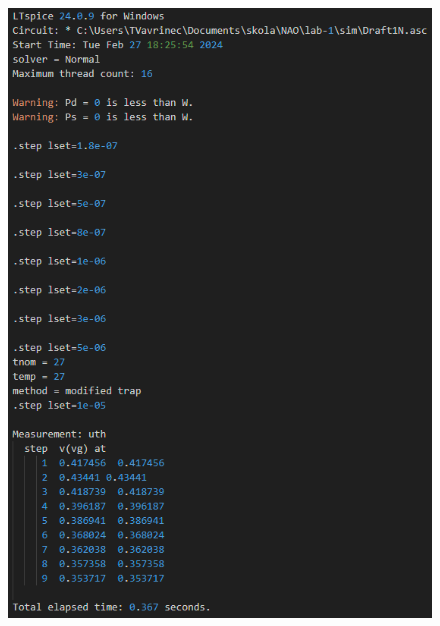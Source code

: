 \begin{figure}[H]
    \begin{minipage}{0.5\textwidth}
        \centering
        \includegraphics[height=0.4\textheight]{log/N-UTH0-WL_const.png}
    \end{minipage}
    \hfill
    \begin{minipage}{0.5\textwidth}
        \centering

\end{minipage}
\end{figure}

